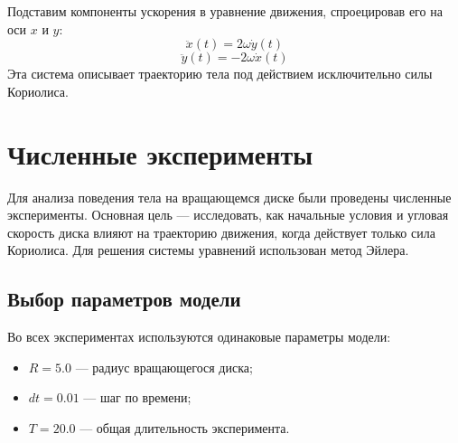 \documentclass[a4paper,12pt]{article}
\begin{document}
Подставим компоненты ускорения в уравнение движения, спроецировав его на оси $x$ и $y$:
\[
\ddot{x}(t) = 2\omega \dot{y}(t)
\]
\[
\ddot{y}(t) = -2\omega \dot{x}(t)
\]
Эта система описывает траекторию тела под действием исключительно силы Кориолиса.

\newpage

\section{Численные эксперименты}

Для анализа поведения тела на вращающемся диске были проведены численные эксперименты. Основная цель — исследовать, как начальные условия и угловая скорость диска влияют на траекторию движения, когда действует только сила Кориолиса. Для решения системы уравнений использован метод Эйлера.

\subsection*{Выбор параметров модели}

Во всех экспериментах используются одинаковые параметры модели:
\begin{itemize}
    \item $R = 5.0$ — радиус вращающегося диска;
    \item $dt = 0.01$ — шаг по времени;
    \item $T = 20.0$ — общая длительность эксперимента.
\end{itemize}

\newpage

\end{document}
